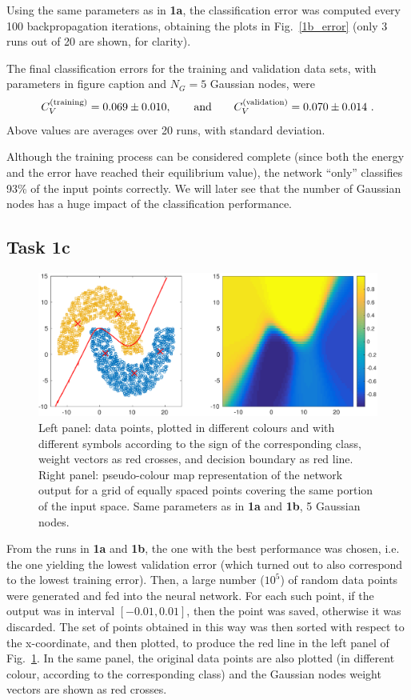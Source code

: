 \documentclass[12pt,titlepage]{article}
\begin{document}
Using the same parameters as in \textbf{1a}, the classification error was computed every 100 backpropagation iterations, obtaining the plots in Fig.~\ref{1b_error} (only 3 runs out of 20 are shown, for clarity).

The final classification errors for the training and validation data sets, with parameters in figure caption and $N_G = 5$ Gaussian nodes, were
\[
C_V^{(\textup{training})} = 0.069 \pm 0.010 , \qquad \mbox{and} \qquad C_V^{(\textup{validation})} = 0.070 \pm 0.014 \ .
\]
Above values are averages over 20 runs, with standard deviation.

Although the training process can be considered complete (since both the energy and the error have reached their equilibrium value), the network ``only'' classifies 93\% of the input points correctly. We will later see that the number of Gaussian nodes has a huge impact of the classification performance.

  
\clearpage
\subsection*{Task 1c}

\begin{figure}[htbp]
\centering
\includegraphics[width=\textwidth]{1c_boundary.pdf}
\caption{Left panel: data points, plotted in different colours and with different symbols according to the sign of the corresponding class, weight vectors as red crosses, and decision boundary as red line. Right panel: pseudo-colour map representation of the network output for a grid of equally spaced points covering the same portion of the input space. Same parameters as in \textbf{1a} and \textbf{1b}, 5 Gaussian nodes.}
\label{fig:1c_boundary}
\end{figure}

From the runs in \textbf{1a} and \textbf{1b}, the one with the best performance was chosen, i.e. the one yielding the lowest validation error (which turned out to also correspond to the lowest training error).
Then, a large number ($10^5$) of random data points were generated and fed into the neural network. For each such point, if the output was in interval $[-0.01, 0.01]$, then the point was saved, otherwise it was discarded. The set of points obtained in this way was then sorted with respect to the x-coordinate, and then plotted, to produce the red line in the left panel of Fig.~\ref{fig:1c_boundary}. In the same panel, the original data points are also plotted (in different colour, according to the corresponding class) and the Gaussian nodes weight vectors are shown as red crosses. 
\end{document}
